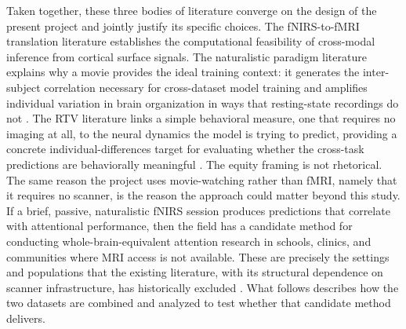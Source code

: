Taken together, these three bodies of literature converge on the design of the present
project and jointly justify its specific choices. The fNIRS-to-fMRI translation
literature establishes the computational feasibility of cross-modal inference from
cortical surface signals. The naturalistic paradigm literature explains why a movie
provides the ideal training context: it generates the inter-subject correlation necessary
for cross-dataset model training and amplifies individual variation in brain organization
in ways that resting-state recordings do not \parencite{gao2025, hasson2010, finn2021}.
The RTV literature links a simple behavioral measure, one that requires no imaging at
all, to the neural dynamics the model is trying to predict, providing a concrete
individual-differences target for evaluating whether the cross-task predictions are
behaviorally meaningful \parencite{kofler2013}. The equity framing is not rhetorical.
The same reason the project uses movie-watching rather than fMRI, namely that it
requires no scanner, is the reason the approach could matter beyond this study. If a
brief, passive, naturalistic fNIRS session produces predictions that correlate with
attentional performance, then the field has a candidate method for conducting
whole-brain-equivalent attention research in schools, clinics, and communities where MRI
access is not available. These are precisely the settings and populations that the
existing literature, with its structural dependence on scanner infrastructure, has
historically excluded \parencite{farah2006, burns2019, noble2015}. What follows
describes how the two datasets are combined and analyzed to test whether that candidate
method delivers.
